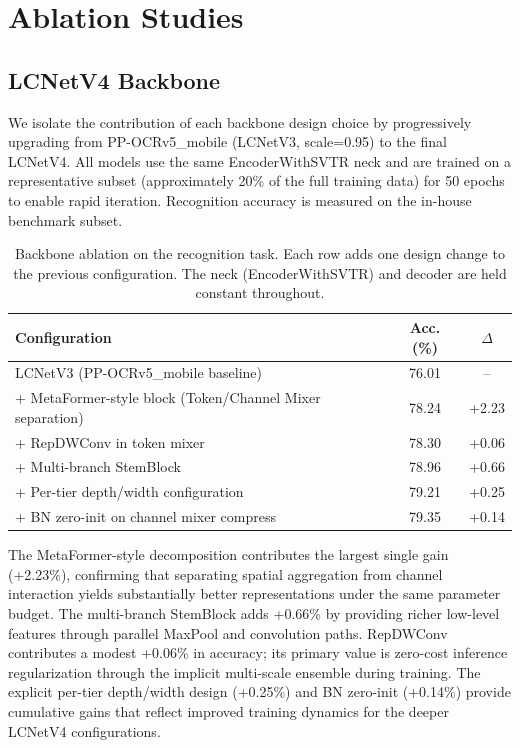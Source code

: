 \documentclass[11pt, a4paper,logo,  copyright, nonumbering]{paddleocr}
\begin{document}
\newpage
\section{Ablation Studies}
\label{sec:ablation_all}

\subsection{LCNetV4 Backbone}
\label{sec:ablation_backbone}

We isolate the contribution of each backbone design choice by progressively upgrading from PP-OCRv5\_mobile (LCNetV3, scale=0.95) to the final LCNetV4. All models use the same EncoderWithSVTR neck and are trained on a representative subset (approximately 20\% of the full training data) for 50 epochs to enable rapid iteration. Recognition accuracy is measured on the in-house benchmark subset.

\begin{table}[h]
\centering
\small
\begin{tabular}{lcc}
\toprule
\textbf{Configuration} & \textbf{Acc. (\%)} & \textbf{$\Delta$} \\
\midrule
LCNetV3 (PP-OCRv5\_mobile baseline) & 76.01 & -- \\
+ MetaFormer-style block (Token/Channel Mixer separation) & 78.24 & +2.23 \\
+ RepDWConv in token mixer & 78.30 & +0.06 \\
+ Multi-branch StemBlock & 78.96 & +0.66 \\
+ Per-tier depth/width configuration & 79.21 & +0.25 \\
+ BN zero-init on channel mixer compress & 79.35 & +0.14 \\
\bottomrule
\end{tabular}
\caption{Backbone ablation on the recognition task. Each row adds one design change to the previous configuration. The neck (EncoderWithSVTR) and decoder are held constant throughout.}
\label{tab:ablation_backbone}
\end{table}

The MetaFormer-style decomposition contributes the largest single gain (+2.23\%), confirming that separating spatial aggregation from channel interaction yields substantially better representations under the same parameter budget. The multi-branch StemBlock adds +0.66\% by providing richer low-level features through parallel MaxPool and convolution paths. RepDWConv contributes a modest +0.06\% in accuracy; its primary value is zero-cost inference regularization through the implicit multi-scale ensemble during training. The explicit per-tier depth/width design (+0.25\%) and BN zero-init (+0.14\%) provide cumulative gains that reflect improved training dynamics for the deeper LCNetV4 configurations.
\end{document}
